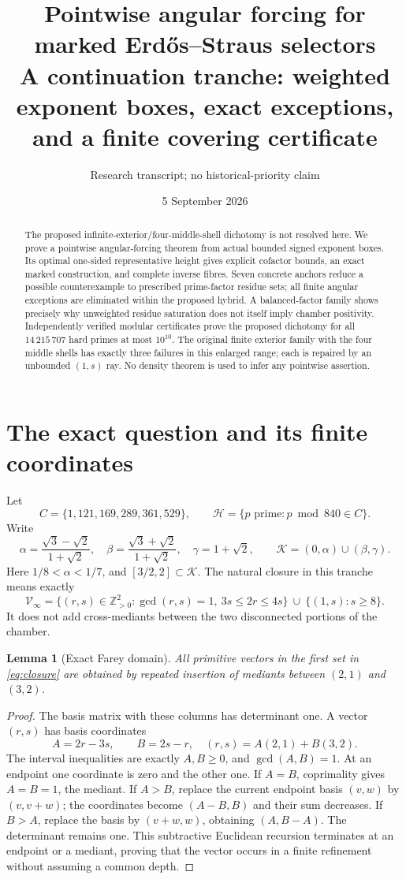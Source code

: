 \documentclass[11pt]{article}
\title{Pointwise angular forcing for marked Erd\H{o}s--Straus selectors\\
\large A continuation tranche: weighted exponent boxes, exact exceptions, and a finite covering certificate}
\author{Research transcript; no historical-priority claim}
\date{5 September 2026}
\newtheorem{lemma}[theorem]{Lemma}
\theoremstyle{definition}\newtheorem{definition}[theorem]{Definition}
\theoremstyle{remark}\newtheorem{remark}[theorem]{Remark}
\newcommand{\K}{\mathcal K}
\newcommand{\HH}{\mathcal H}
\newcommand{\V}{\mathcal V}
\begin{document}
\maketitle
\begin{abstract}
The proposed infinite-exterior/four-middle-shell dichotomy is not resolved here. We prove a pointwise angular-forcing theorem from actual bounded signed exponent boxes. Its optimal one-sided representative height gives explicit cofactor bounds, an exact marked construction, and complete inverse fibres. Seven concrete anchors reduce a possible counterexample to prescribed prime-factor residue sets; all finite angular exceptions are eliminated within the proposed hybrid. A balanced-factor family shows precisely why unweighted residue saturation does not itself imply chamber positivity. Independently verified modular certificates prove the proposed dichotomy for all $14\,215\,707$ hard primes at most $10^{10}$. The original finite exterior family with the four middle shells has exactly three failures in this enlarged range; each is repaired by an unbounded $(1,s)$ ray. No density theorem is used to infer any pointwise assertion.
\end{abstract}

\section{The exact question and its finite coordinates}
Let
\[
 C=\{1,121,169,289,361,529\},\qquad
 \HH=\{p\text{ prime}:p\bmod840\in C\}.
\]
Write
\[
 \alpha=\frac{\sqrt3-\sqrt2}{1+\sqrt2},\quad
 \beta=\frac{\sqrt3+\sqrt2}{1+\sqrt2},\quad
 \gamma=1+\sqrt2,\qquad
 \K=(0,\alpha)\cup(\beta,\gamma).
\]
Here $1/8<\alpha<1/7$, and $[3/2,2]\subset\K$.
The natural closure in this tranche means exactly
\begin{equation}\label{eq:closure}
 \V_\infty=
 \{(r,s)\in\mathbb Z_{>0}^2:\gcd(r,s)=1,\ 3s\le2r\le4s\}
 \ \cup\ \{(1,s):s\ge8\}.
\end{equation}
It does not add cross-mediants between the two disconnected portions of the chamber.

\begin{lemma}[Exact Farey domain]\label{lem:farey}
All primitive vectors in the first set in \eqref{eq:closure} are obtained by repeated insertion of mediants between $(2,1)$ and $(3,2)$.
\end{lemma}
\begin{proof}
The basis matrix with these columns has determinant one. A vector $(r,s)$ has basis coordinates
\[
 A=2r-3s,\qquad B=2s-r,
\quad (r,s)=A(2,1)+B(3,2).
\]
The interval inequalities are exactly $A,B\ge0$, and $\gcd(A,B)=1$. At an endpoint one coordinate is zero and the other one. If $A=B$, coprimality gives $A=B=1$, the mediant. If $A>B$, replace the current endpoint basis $(v,w)$ by $(v,v+w)$; the coordinates become $(A-B,B)$ and their sum decreases. If $B>A$, replace the basis by $(v+w,w)$, obtaining $(A,B-A)$. The determinant remains one. This subtractive Euclidean recursion terminates at an endpoint or a mediant, proving that the vector occurs in a finite refinement without assuming a common depth.
\end{proof}
\end{document}
